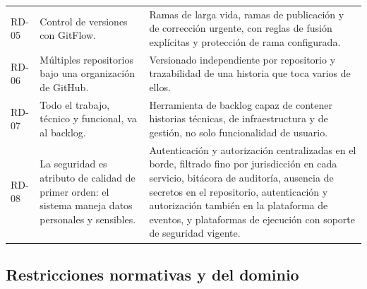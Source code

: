\documentclass[11pt,a4paper]{article}
\begin{document}
\begin{longtable}{L{1.2cm} L{6.0cm} L{7.0cm}}
RD-05 & Control de versiones con GitFlow. & Ramas de larga vida, ramas de publicación y de corrección urgente, con reglas de fusión explícitas y protección de rama configurada. \\
RD-06 & Múltiples repositorios bajo una organización de GitHub. & Versionado independiente por repositorio y trazabilidad de una historia que toca varios de ellos. \\
RD-07 & Todo el trabajo, técnico y funcional, va al backlog. & Herramienta de backlog capaz de contener historias técnicas, de infraestructura y de gestión, no solo funcionalidad de usuario. \\
RD-08 & La seguridad es atributo de calidad de primer orden: el sistema maneja datos personales y sensibles. & Autenticación y autorización centralizadas en el borde, filtrado fino por jurisdicción en cada servicio, bitácora de auditoría, ausencia de secretos en el repositorio, autenticación y autorización también en la plataforma de eventos, y plataformas de ejecución con soporte de seguridad vigente. \\
\end{longtable}

\subsection{Restricciones normativas y del dominio}
\end{document}
